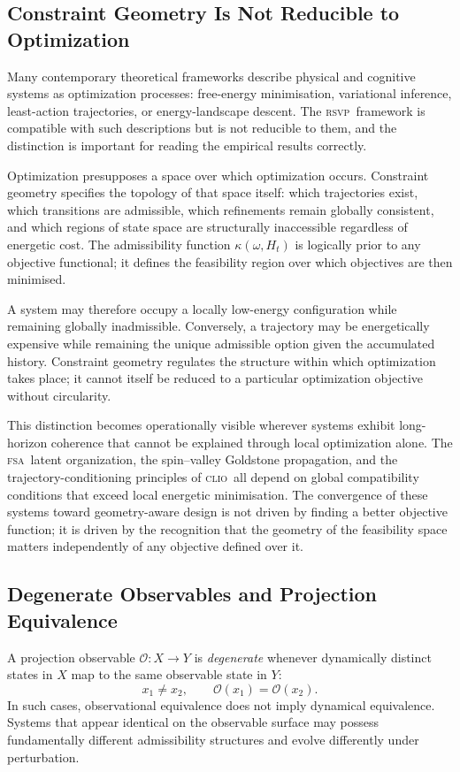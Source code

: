 \documentclass[11pt,a4paper]{article}
\theoremstyle{plain}
\theoremstyle{definition}
\theoremstyle{remark}
\newcommand{\RSVP}{\textup{\textsc{rsvp}}}
\newcommand{\CLIO}{\textup{\textsc{clio}}}
\newcommand{\FSA}{\textup{\textsc{fsa}}}
\begin{document}
\subsection{Constraint Geometry Is Not Reducible to Optimization}

Many contemporary theoretical frameworks describe physical and cognitive
systems as optimization processes: free-energy minimisation, variational
inference, least-action trajectories, or energy-landscape descent. The
\RSVP\ framework is compatible with such descriptions but is not reducible
to them, and the distinction is important for reading the empirical results
correctly.

Optimization presupposes a space over which optimization occurs. Constraint
geometry specifies the topology of that space itself: which trajectories
exist, which transitions are admissible, which refinements remain globally
consistent, and which regions of state space are structurally inaccessible
regardless of energetic cost. The admissibility function $\kappa(\omega,
H_t)$ is logically prior to any objective functional; it defines the
feasibility region over which objectives are then minimised.

A system may therefore occupy a locally low-energy configuration while
remaining globally inadmissible. Conversely, a trajectory may be
energetically expensive while remaining the unique admissible option given
the accumulated history. Constraint geometry regulates the structure within
which optimization takes place; it cannot itself be reduced to a particular
optimization objective without circularity.

This distinction becomes operationally visible wherever systems exhibit
long-horizon coherence that cannot be explained through local optimization
alone. The \FSA\ latent organization, the spin--valley Goldstone propagation,
and the trajectory-conditioning principles of \CLIO\ all depend on global
compatibility conditions that exceed local energetic minimisation. The
convergence of these systems toward geometry-aware design is not driven by
finding a better objective function; it is driven by the recognition that
the geometry of the feasibility space matters independently of any objective
defined over it.

\subsection{Degenerate Observables and Projection Equivalence}

A projection observable $\mathcal{O}: X \to Y$ is \textit{degenerate}
whenever dynamically distinct states in $X$ map to the same observable
state in $Y$:
\[
x_1 \neq x_2, \qquad \mathcal{O}(x_1) = \mathcal{O}(x_2).
\]
In such cases, observational equivalence does not imply dynamical
equivalence. Systems that appear identical on the observable surface may
possess fundamentally different admissibility structures and evolve
differently under perturbation.
\end{document}
